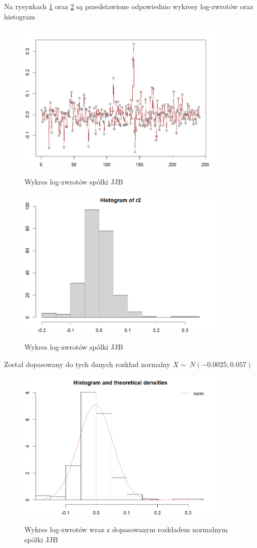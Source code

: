 \documentclass[a4paper,11pt]{article}
\begin{document}
Na rysynkach \ref{fig:jjb_wykres_log} oraz \ref{fig:jjb_hist_log} są przedstawione odpowiednio wykresy log-zwrotów oraz histogram
\begin{figure}[htb]
	\centering
	\includegraphics[width=10cm]{jjb_wykres_log.png}
        \label{fig:jjb_wykres_log}
	\caption{Wykres log-zwrotów spółki JJB}
\end{figure}

\begin{figure}[htb]
	\centering
	\includegraphics[width=10cm]{jjb_hist_log.png}
        \label{fig:jjb_hist_log}
	\caption{Wykres log-zwrotów spółki JJB}
\end{figure}

Został dopasowany do tych danych rozkład normalny $X \sim\ N(-0.0025,0.057 )$
\begin{figure}[htb]
	\centering
	\includegraphics[width=10cm]{jjb_histwykres_log.png}
        \label{fig:jjb_histwykres_log}
	\caption{Wykres log-zwrotów wraz z dopasowanym rozkładem normalnym spółki JJB}
\end{figure}
\end{document}

